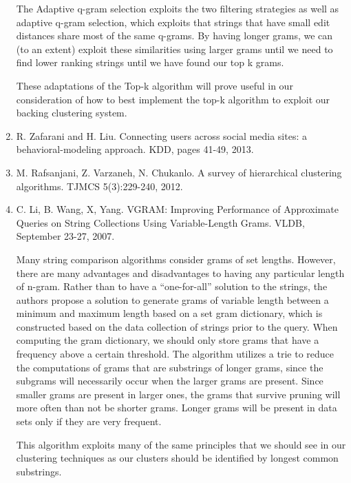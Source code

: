 \documentclass[pdftex,12pt,letter]{article}
\begin{document}
\begin{enumerate}
	The Adaptive q-gram selection exploits the two filtering strategies as well as adaptive q-gram selection, which exploits that strings that have small edit distances share most of the same q-grams. By having longer grams, we can (to an extent) exploit these similarities using larger grams until we need to find lower ranking strings until we have found our top k grams. 

	These adaptations of the Top-k algorithm will prove useful in our consideration of how to best implement the top-k algorithm to exploit our backing clustering system. 


\item R. Zafarani and H. Liu. Connecting users across social media sites: a behavioral-modeling approach. KDD, pages 41-49, 2013.
\item M. Rafsanjani, Z. Varzaneh, N. Chukanlo. A survey of hierarchical clustering algorithms. TJMCS 5(3):229-240, 2012.
\item C. Li, B. Wang, X, Yang. VGRAM: Improving Performance of Approximate Queries on String Collections Using Variable-Length Grams. VLDB, September 23-27, 2007.

	Many string comparison algorithms consider grams of set lengths. However, there are many advantages and disadvantages to having any particular length of n-gram. Rather than to have a “one-for-all” solution to the strings, the authors propose a solution to generate grams of variable length between a minimum and maximum length based on a set gram dictionary, which is constructed based on the data collection of strings prior to the query. When computing the gram dictionary, we should only store grams that have a frequency above a certain threshold. The algorithm utilizes a trie to reduce the computations of grams that are substrings of longer grams, since the subgrams will necessarily occur when the larger grams are present. Since smaller grams are present in larger ones, the grams that survive pruning will more often than not be shorter grams. Longer grams will be present in data sets only if they are very frequent. 

	This algorithm exploits many of the same principles that we should see in our clustering techniques as our clusters should be identified by longest common substrings. 



\end{enumerate}
\FloatBarrier
\end{document}
